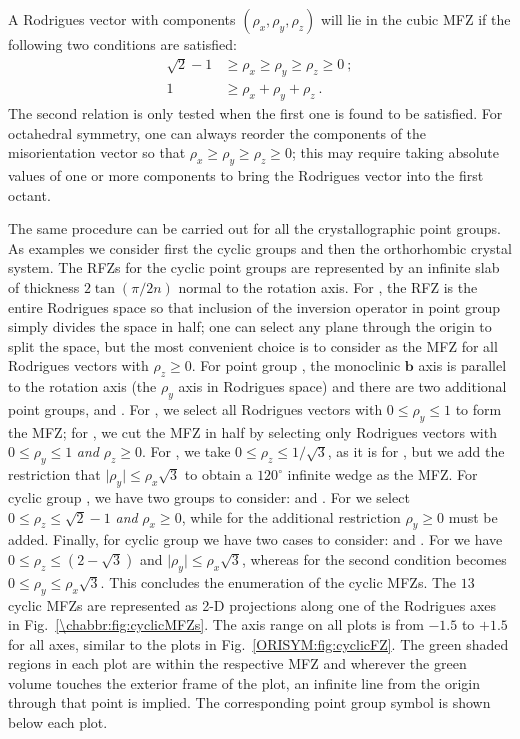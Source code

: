 A Rodrigues vector with components $(\rho_x,\rho_y,\rho_z)$ will lie in the cubic MFZ if the following two conditions are satisfied:
\begin{equation}
\begin{split}
	\sqrt{2}-1 &\ge \rho_x\ge\rho_y\ge\rho_z\ge 0\ ;\\
	1 &\ge \rho_x+\rho_y+\rho_z\ .
\end{split}
\end{equation}
The second relation is only tested when the first one is found to be satisfied.  For octahedral symmetry, one can always reorder the components of the misorientation vector so that $\rho_x\ge\rho_y\ge\rho_z\ge 0$; this may require taking absolute values of one or more components to bring the Rodrigues vector into the first octant.

The same procedure can be carried out for all the crystallographic point groups.  As examples we consider first the cyclic groups and then the orthorhombic crystal system.  The RFZs for the cyclic point groups are represented by an infinite slab of thickness $2\tan(\pi/2n)$ normal to the rotation axis. For , the RFZ is the entire Rodrigues space so that inclusion of the inversion operator in point group  simply divides the space in half; one can select any plane through the origin to split the space, but the most convenient choice is to consider as the MFZ for  all Rodrigues vectors with $\rho_z\ge 0$. For point group , the monoclinic $\mathbf{b}$ axis is parallel to the rotation axis (the $\rho_y$ axis in Rodrigues space) and there are two additional point groups,  and .  For , we select all Rodrigues vectors with $0\le\rho_y\le1$ to form the MFZ; for , we cut the  MFZ in half by selecting only Rodrigues vectors with $0\le\rho_y\le1$ \textit{and} $\rho_z\ge 0$. For , we take $0\le\rho_z\le 1/\sqrt{3}$, as it is for , but we add the restriction that $\vert\rho_y\vert\le \rho_x\sqrt{3}$ to obtain a $120^{\circ}$ infinite wedge as the MFZ.  For cyclic group , we have two groups to consider:  and . For  we select $0\le\rho_z\le\sqrt{2}-1$ \textit{and} $\rho_x\ge 0$, while for  the additional restriction $\rho_y\ge 0$ must be added.  Finally, for cyclic group  we have two cases to consider:  and . For  we have $0\le\rho_z\le (2-\sqrt{3})$ and $\vert\rho_y\vert\le\rho_x\sqrt{3}$, whereas for  the second condition becomes $0\le\rho_y\le\rho_x\sqrt{3}$.  This concludes the enumeration of the cyclic MFZs.  The $13$ cyclic MFZs are represented as 2-D projections along one of the Rodrigues axes in Fig.~\ref{\chabbr:fig:cyclicMFZs}. The axis range on all plots is from $-1.5$ to $+1.5$ for all axes, similar to the plots in Fig.~\ref{ORISYM:fig:cyclicFZ}.  The green shaded regions in each plot are within the respective MFZ and wherever the green volume touches the exterior frame of the plot, an infinite line from the origin through that point is implied.  The corresponding point group symbol is shown below each plot.

